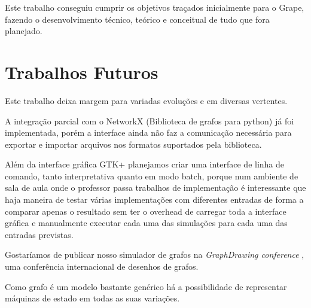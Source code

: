 \documentclass[a4paper]{abnt}
\begin{document}
Este trabalho conseguiu cumprir os objetivos traçados inicialmente para o Grape, fazendo o desenvolvimento técnico, teórico e conceitual de tudo que fora planejado.

\chapter{Trabalhos Futuros}
\label{sec:trabalhos_futuros}

Este trabalho deixa margem para variadas evoluções e em diversas vertentes.

A integração parcial com o NetworkX \cite{networkx} (Biblioteca de grafos para python) já foi implementada, porém a interface ainda não faz a comunicação necessária para exportar e importar arquivos nos formatos suportados pela biblioteca.

Além da interface gráfica GTK+ planejamos criar uma interface de linha de comando, tanto interpretativa quanto em modo batch, porque num ambiente de sala de aula onde o professor passa trabalhos de implementação é interessante que haja maneira de testar várias implementações com diferentes entradas de forma a comparar apenas o resultado sem ter o overhead de carregar toda a interface gráfica e manualmente executar cada uma das simulações para cada uma das entradas previstas.

Gostaríamos de publicar nosso simulador de grafos na \textit{GraphDrawing conference} \cite{graphdrawing}, uma conferência internacional de desenhos de grafos.

Como grafo é um modelo bastante genérico há a possibilidade de representar máquinas de estado em todas as suas variações.



\end{document}
